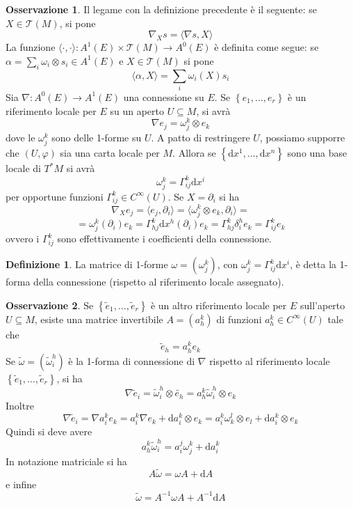 \documentclass[a4paper,11pt]{article}
\theoremstyle{definition}
\newtheorem{osservazione}{Osservazione}[section]
\newtheorem{definizione}{Definizione}[section]
\theoremstyle{theorem}
\newcommand{\dif}{\mathrm{d}}
\newcommand{\T}{\mathcal{T}}
\begin{document}
\begin{osservazione}
	Il legame con la definizione precedente è il seguente: se $X\in\T(M)$, si pone
	\[\nabla_Xs=\langle\nabla s,X\rangle\]
	La funzione $\langle\cdot,\cdot\rangle\colon A^1(E)\times\T(M)\to A^0(E)$ è definita come segue: se $\alpha=\sum_i\omega_i\otimes s_i\in A^1(E)$ e $X\in\T(M)$ si pone
	\[\langle\alpha,X\rangle=\sum_i\omega_i(X)s_i\]
	Sia $\nabla\colon A^0(E)\to A^1(E)$ una connessione su $E$. Se $\left\{e_1,\dots,e_r\right\}$ è un riferimento locale per $E$ su un aperto $U\subseteq M$, si avrà
	\[\nabla e_j=\omega_j^k\otimes e_k\]
	dove le $\omega_j^k$ sono delle 1-forme su $U$. A patto di restringere $U$, possiamo supporre che $(U,\varphi)$ sia una carta locale per $M$. Allora se $\left\{\dif x^1,\dots,\dif x^n\right\}$ sono una base locale di $T^*M$ si avrà
	\[\omega_j^k=\Gamma^k_{ij}\dif x^i\]
	per opportune funzioni $\Gamma^k_{ij}\in C^\infty(U)$. Se $X=\partial_i$ si ha
	\[\nabla_Xe_j=\langle e_j,\partial_i\rangle=\langle\omega_j^k\otimes e_k,\partial_i\rangle=\]\[=\omega_j^k(\partial_i)e_k=\Gamma^k_{hj}\dif x^h(\partial_i)e_k=\Gamma^k_{hj}\delta^h_ie_k=\Gamma^k_{ij}e_k\]
	ovvero i $\Gamma^k_{ij}$ sono effettivamente i coefficienti della connessione.
\end{osservazione}
\begin{definizione}
	La matrice di 1-forme $\omega=\left(\omega_j^k\right)$, con $\omega_j^k=\Gamma^k_{ij}\dif x^i$, è detta la 1-forma della connessione (rispetto al riferimento locale assegnato).
\end{definizione}
\begin{osservazione}
	Se $\left\{\tilde e_1,\dots,\tilde{e}_r\right\}$ è un altro riferimento locale per $E$ sull'aperto $U\subseteq M$, esiste una matrice invertibile $A=\left(a_h^k\right)$ di funzioni $a_h^k\in C^\infty(U)$ tale che
	\[\tilde{e}_h=a_h^ke_k\]
	Se $\tilde{\omega}=\left(\tilde{\omega}_i^h\right)$ è la 1-forma di connessione di $\nabla$ rispetto al riferimento locale $\left\{\tilde{e}_1,\dots,\tilde{e}_r\right\}$, si ha
	\[\nabla\tilde{e}_i=\tilde{\omega}_i^h\otimes\tilde{e_h}=a_h^k\tilde{\omega}_i^h\otimes e_k\]
	Inoltre
	\[\nabla\tilde{e}_i=\nabla a_i^ke_k=a_i^k\nabla e_k+\dif a_i^k\otimes e_k=a_i^k\omega_k^l\otimes e_l+\dif a_i^k\otimes e_k\]
	Quindi si deve avere
	\[a_h^k\tilde\omega_i^h=a_i^j\omega_j^k+\dif a_i^k\]
	In notazione matriciale si ha
	\[A\tilde{\omega}=\omega A+\dif A\]
	e infine
	\[\tilde{\omega}=A^{-1}\omega A+A^{-1}\dif A\]
\end{osservazione}
\end{document}
